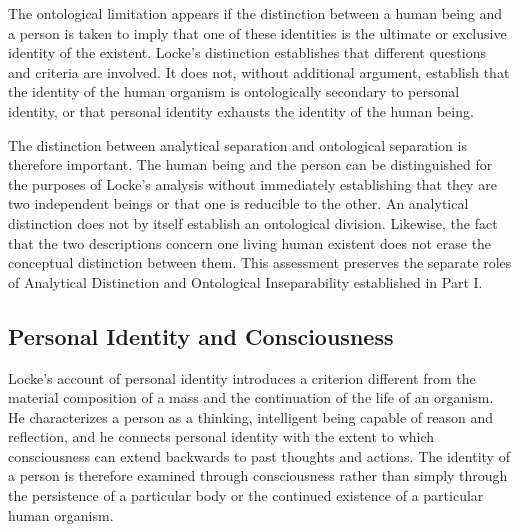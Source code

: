 The ontological limitation appears if the distinction
between a human being and a person is taken to imply
that one of these identities is the ultimate or
exclusive identity of the existent. Locke's distinction
establishes that different questions and criteria
are involved. It does not, without additional
argument, establish that the identity of the human
organism is ontologically secondary to personal
identity, or that personal identity exhausts the
identity of the human being.

\label{para:VS.B01.P01.C08.S08.SS06.P005}

The distinction between analytical separation and
ontological separation is therefore important.
The human being and the person can be distinguished
for the purposes of Locke's analysis without
immediately establishing that they are two
independent beings or that one is reducible to
the other. An analytical distinction does not
by itself establish an ontological division.
Likewise, the fact that the two descriptions concern
one living human existent does not erase the
conceptual distinction between them. This assessment
preserves the separate roles of Analytical Distinction
and Ontological Inseparability established in Part I.



\subsection{Personal Identity and Consciousness}
\label{subsec:ch08-locke-person-consciousness}

\label{para:VS.B01.P01.C08.S08.SS07.P001}

Locke's account of personal identity introduces a
criterion different from the material composition
of a mass and the continuation of the life of an
organism. He characterizes a person as a thinking,
intelligent being capable of reason and reflection,
and he connects personal identity with the extent
to which consciousness can extend backwards to
past thoughts and actions. The identity of a person
is therefore examined through consciousness rather
than simply through the persistence of a particular
body or the continued existence of a particular
human organism. \cite[II.xxvii.9--11]{LockeEssay}

